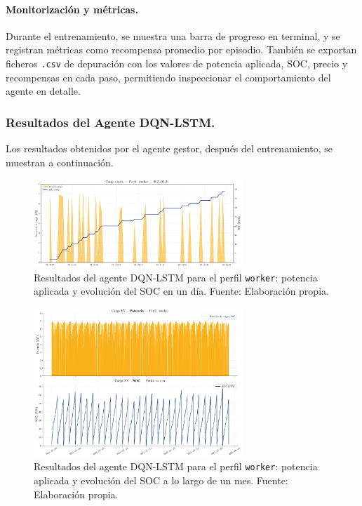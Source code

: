 \paragraph{Monitorización y métricas.}  
Durante el entrenamiento, se muestra una barra de progreso en terminal, y se registran métricas 
como recompensa promedio por episodio. También se exportan ficheros \texttt{.csv} de depuración con 
los valores de potencia aplicada, SOC, precio y recompensas en cada paso, permitiendo inspeccionar 
el comportamiento del agente en detalle.

\subsubsection{Resultados del Agente DQN-LSTM.}
Los resultados obtenidos por el agente gestor, después del entrenamiento, se muestran a continuación.
\begin{figure}[H]
    \centering
    \includegraphics[width=0.7\textwidth]{images/dqnlstm/daily_behavior_2021-03-21_worker.png}
    \caption{Resultados del agente DQN-LSTM para el perfil \texttt{worker}: potencia aplicada y 
    evolución del SOC en un día. Fuente: Elaboración propia.}
    \label{fig:dqn_daily_profiles}
\end{figure}
\begin{figure}[H]
    \centering
    \includegraphics[width=0.7\textwidth]{images/dqnlstm/worker_monthly_behavior_july_bold.png}
    \caption{Resultados del agente DQN-LSTM para el perfil \texttt{worker}: potencia aplicada y 
    evolución del SOC a lo largo de un mes. Fuente: Elaboración propia.}
    \label{fig:dqn_global_profiles}
\end{figure}

